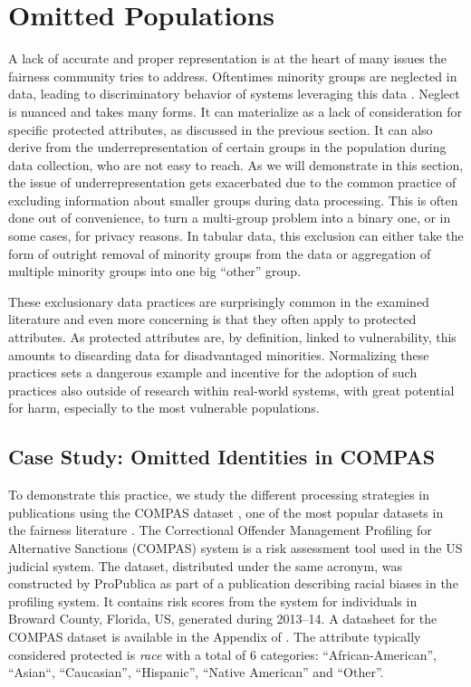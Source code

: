 \section{Omitted Populations}\label{sec:omitted}

A lack of accurate and proper representation is at the heart of many issues the fairness community tries to address. Oftentimes minority groups are neglected in data, leading to discriminatory behavior of systems leveraging this data \citep{mehrabi2022survey}. Neglect is nuanced and takes many forms. It can materialize as a lack of consideration for specific protected attributes, as discussed in the previous section. It can also derive from the underrepresentation of certain groups in the population during data collection, who are not easy to reach. As we will demonstrate in this section, the issue of underrepresentation gets exacerbated due to the common practice of excluding information about smaller groups during data processing. This is often done out of convenience, to turn a multi-group problem into a binary one, or in some cases, for privacy reasons. In tabular data, this exclusion can either take the form of outright removal of minority groups from the data or aggregation of multiple minority groups into one big ``other'' group.

These exclusionary data practices are surprisingly common in the examined literature and even more concerning is that they often apply to protected attributes. As protected attributes are, by definition, linked to vulnerability, this amounts to discarding data for disadvantaged minorities. Normalizing these practices sets a dangerous example and incentive for the adoption of such practices also outside of research within real-world systems, with great potential for harm, especially to the most vulnerable populations.

\subsection*{Case Study: Omitted Identities in COMPAS}

To demonstrate this practice, we study the different processing strategies in publications using the COMPAS dataset \citep{angwin2016machine}, one of the most popular datasets in the fairness literature \citep{fabris2022algorithmic}. The Correctional Offender Management Profiling for Alternative Sanctions (COMPAS) system is a risk assessment tool used in the US judicial system. The dataset, distributed under the same acronym, was constructed by ProPublica as part of a publication describing racial biases in the profiling system. It contains risk scores from the system for individuals in Broward County, Florida, US, generated during 2013--14. A datasheet \citep{gebru2021datasheets} for the COMPAS dataset is available in the Appendix of \citet{fabris2022algorithmic}. The attribute typically considered protected is \textit{race} with a total of 6 categories: ``African-American'', ``Asian``, ``Caucasian'', ``Hispanic'', ``Native American'' and ``Other''.

